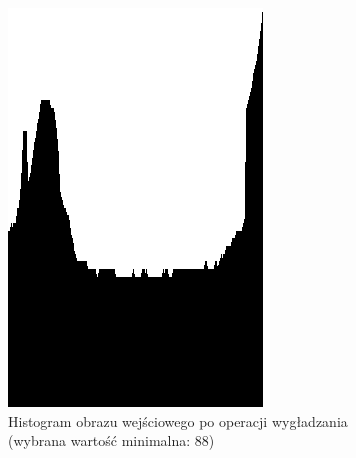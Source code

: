\begin{figure}
  \centering
  \begin{subfigure}[b]{0.45\textwidth}
    \includegraphics[width=\textwidth]{img/research-min-histogram-good-histogram}
    \caption{Histogram obrazu wejściowego po operacji wygładzania (wybrana wartość minimalna: 88)}
    \label{fig:research_min_histogram_good_histogram}
  \end{subfigure}
  ~
  \begin{subfigure}[b]{0.45\textwidth}

\end{subfigure}
\end{figure}
